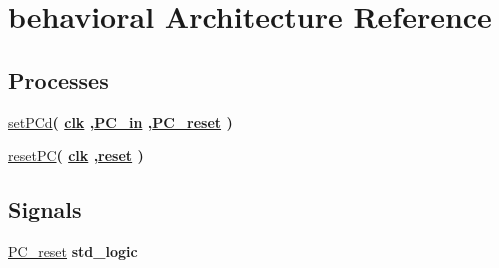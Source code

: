 \hypertarget{classpc_1_1behavioral}{\section{behavioral \-Architecture \-Reference}
\label{classpc_1_1behavioral}
}
\*
\*
\subsection*{\-Processes}
 \begin{DoxyCompactItemize}
\item 
\hyperlink{classpc_1_1behavioral_a332633eaeaa8c626e83ca70d41e3977b}{set\-P\-Cd}{\bfseries  ( {\bfseries {\bfseries \hyperlink{classpc_a66122f468837e0c758d57582b68eb123}{clk}}   ,{\bfseries \hyperlink{classpc_add4c01f1cc397a05cf5ad7aa3b694cea}{\-P\-C\-\_\-in}}  ,{\bfseries \hyperlink{classpc_1_1behavioral_abbc54b6aa1aa953752a7f9782592d678}{\-P\-C\-\_\-reset}}  } )}
\item 
\hyperlink{classpc_1_1behavioral_a38ebb9e0673575be5e25930948caff33}{reset\-P\-C}{\bfseries  ( {\bfseries {\bfseries \hyperlink{classpc_a66122f468837e0c758d57582b68eb123}{clk}}   ,{\bfseries \hyperlink{classpc_ab46b7d3d37e6c21a29a6f2a207682d72}{reset}}  } )}
\end{DoxyCompactItemize}
\subsection*{\-Signals}
 \begin{DoxyCompactItemize}
\item 
\hyperlink{classpc_1_1behavioral_abbc54b6aa1aa953752a7f9782592d678}{\-P\-C\-\_\-reset} {\bfseries std\-\_\-logic } 
\end{DoxyCompactItemize}


